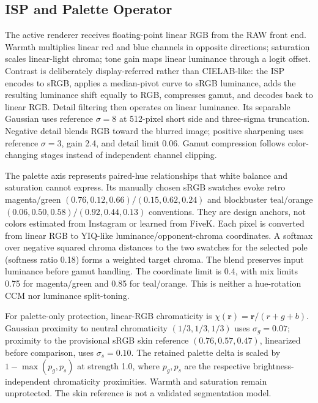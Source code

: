 \documentclass[journal]{IEEEtran}
\begin{document}
\subsection{ISP and Palette Operator}
The active renderer receives floating-point linear RGB from the RAW front end. Warmth multiplies linear red and blue channels in opposite directions; saturation scales linear-light chroma; tone gain maps linear luminance through a logit offset. Contrast is deliberately display-referred rather than CIELAB-like: the ISP encodes to sRGB, applies a median-pivot curve to sRGB luminance, adds the resulting luminance shift equally to RGB, compresses gamut, and decodes back to linear RGB. Detail filtering then operates on linear luminance. Its separable Gaussian uses reference $\sigma=8$ at 512-pixel short side and three-sigma truncation. Negative detail blends RGB toward the blurred image; positive sharpening uses reference $\sigma=3$, gain 2.4, and detail limit 0.06. Gamut compression follows color-changing stages instead of independent channel clipping.

The palette axis represents paired-hue relationships that white balance and saturation cannot express. Its manually chosen sRGB swatches evoke retro magenta/green $(0.76,0.12,0.66)/(0.15,0.62,0.24)$ and blockbuster teal/orange $(0.06,0.50,0.58)/(0.92,0.44,0.13)$ conventions. They are design anchors, not colors estimated from Instagram or learned from FiveK. Each pixel is converted from linear RGB to YIQ-like luminance/opponent-chroma coordinates. A softmax over negative squared chroma distances to the two swatches for the selected pole (softness ratio 0.18) forms a weighted target chroma. The blend preserves input luminance before gamut handling. The coordinate limit is 0.4, with mix limits 0.75 for magenta/green and 0.85 for teal/orange. This is neither a hue-rotation CCM nor luminance split-toning.

For palette-only protection, linear-RGB chromaticity is $\chi(\mathbf{r})=\mathbf{r}/(r+g+b)$. Gaussian proximity to neutral chromaticity $(1/3,1/3,1/3)$ uses $\sigma_g=0.07$; proximity to the provisional sRGB skin reference $(0.76,0.57,0.47)$, linearized before comparison, uses $\sigma_s=0.10$. The retained palette delta is scaled by $1-\max(p_g,p_s)$ at strength 1.0, where $p_g,p_s$ are the respective brightness-independent chromaticity proximities. Warmth and saturation remain unprotected. The skin reference is not a validated segmentation model.
\end{document}
